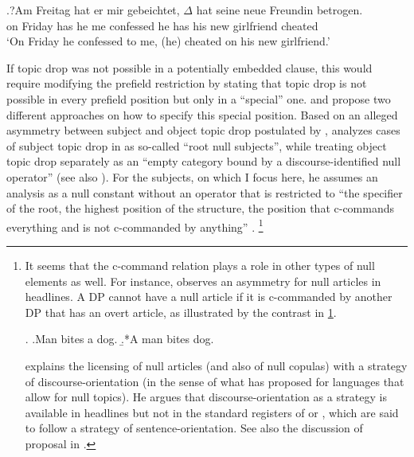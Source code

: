 \exg.?\label{ex:embedded.start}Am Freitag hat er mir gebeichtet, $\Delta$ hat seine neue Freundin betrogen.\\
on Friday has he me confessed he has his new girlfriend cheated\\
`On Friday he confessed to me, (he) cheated on his new girlfriend.'

If topic drop was not possible in a potentially embedded clause, this would require modifying the prefield restriction by stating that topic drop is not possible in every prefield position but only in a ``special'' one.
\citet{rizzi1994} and \citet{freywald2020} propose two different approaches on how to specify this special position.
Based on an alleged asymmetry between subject and object topic drop postulated by \citet{cardinaletti1990},
\citet{rizzi1994} analyzes cases of subject topic drop in  as so-called ``root null subjects'',  while treating object topic drop separately as an ``empty category bound by a discourse-identified null operator''  \citep[160]{rizzi1994} (see also ).
For the subjects, on which I focus here, he assumes an analysis as a null constant without an operator that is restricted to ``the specifier of the root, the highest position of the structure, the position that c-commands  everything and is not c-commanded  by anything'' \citep[162]{rizzi1994}.%
\footnote{It seems that the c-command  relation plays a role in other types of null elements as well.
For instance, \citet{stowell1991, stowell1996} observes an asymmetry for null articles in headlines. 
A DP  cannot have a null article if it is c-commanded  by another DP that has an overt article, as illustrated by the contrast in \ref{ex:stowell}.

\ex.\label{ex:stowell}
\a.Man bites a dog.
\b.*A man bites dog.

\citet{reich2017} explains the licensing of null articles  (and also of null copulas)  with a strategy of discourse-orientation (in the sense of what \cite{huang1984} has proposed for languages that allow for null topics).
He argues that discourse-orientation as a strategy is available in headlines but not in the standard registers of  or , which are said to follow a strategy of sentence-orientation. 
See also the discussion of  proposal in .}

